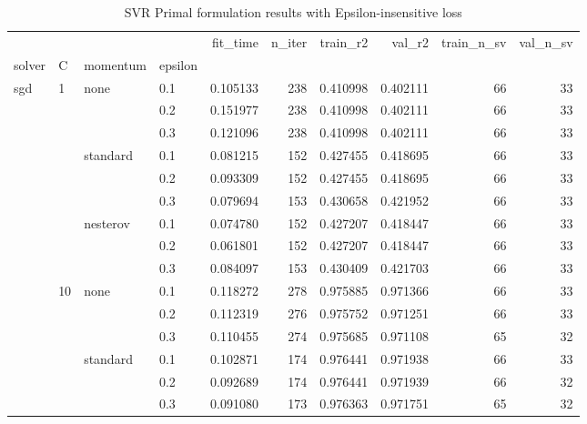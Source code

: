 \begin{table}[H]
\centering
\caption{SVR Primal formulation results with Epsilon-insensitive loss}
\label{primal_svr_eps_cv_results}
\begin{tabular}{llllrrrrrr}
\toprule
          &     &   &     &  fit\_time &  n\_iter &  train\_r2 &    val\_r2 &  train\_n\_sv &  val\_n\_sv \\
solver & C & momentum & epsilon &           &         &           &           &             &           \\
\midrule
sgd & 1   & none & 0.1 &  0.105133 &     238 &  0.410998 &  0.402111 &          66 &        33 \\
          &     &   & 0.2 &  0.151977 &     238 &  0.410998 &  0.402111 &          66 &        33 \\
          &     &   & 0.3 &  0.121096 &     238 &  0.410998 &  0.402111 &          66 &        33 \\
          &     & standard & 0.1 &  0.081215 &     152 &  0.427455 &  0.418695 &          66 &        33 \\
          &     &   & 0.2 &  0.093309 &     152 &  0.427455 &  0.418695 &          66 &        33 \\
          &     &   & 0.3 &  0.079694 &     153 &  0.430658 &  0.421952 &          66 &        33 \\
          &     & nesterov & 0.1 &  0.074780 &     152 &  0.427207 &  0.418447 &          66 &        33 \\
          &     &   & 0.2 &  0.061801 &     152 &  0.427207 &  0.418447 &          66 &        33 \\
          &     &   & 0.3 &  0.084097 &     153 &  0.430409 &  0.421703 &          66 &        33 \\
          & 10  & none & 0.1 &  0.118272 &     278 &  0.975885 &  0.971366 &          66 &        33 \\
          &     &   & 0.2 &  0.112319 &     276 &  0.975752 &  0.971251 &          66 &        33 \\
          &     &   & 0.3 &  0.110455 &     274 &  0.975685 &  0.971108 &          65 &        32 \\
          &     & standard & 0.1 &  0.102871 &     174 &  0.976441 &  0.971938 &          66 &        33 \\
          &     &   & 0.2 &  0.092689 &     174 &  0.976441 &  0.971939 &          66 &        32 \\
          &     &   & 0.3 &  0.091080 &     173 &  0.976363 &  0.971751 &          65 &        32 \\

\end{tabular}
\end{table}
